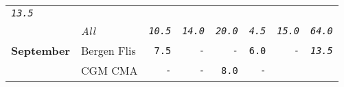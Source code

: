 \documentclass[11pt,A4paper,]{article}
\begin{document}
\begin{longtable}[]{@{}llrrrrrr@{}}
\begin{minipage}[t]{0.12\columnwidth}
\emph{\texttt{13.5}}\strut
\end{minipage}\tabularnewline
\begin{minipage}[t]{0.12\columnwidth}\raggedright\strut
\strut
\end{minipage} & \begin{minipage}[t]{0.12\columnwidth}\raggedright\strut
\emph{All}\strut
\end{minipage} & \begin{minipage}[t]{0.12\columnwidth}\raggedleft\strut
\emph{\texttt{10.5}}\strut
\end{minipage} & \begin{minipage}[t]{0.12\columnwidth}\raggedleft\strut
\emph{\texttt{14.0}}\strut
\end{minipage} & \begin{minipage}[t]{0.12\columnwidth}\raggedleft\strut
\emph{\texttt{20.0}}\strut
\end{minipage} & \begin{minipage}[t]{0.12\columnwidth}\raggedleft\strut
\emph{\texttt{4.5}}\strut
\end{minipage} & \begin{minipage}[t]{0.12\columnwidth}\raggedleft\strut
\emph{\texttt{15.0}}\strut
\end{minipage} & \begin{minipage}[t]{0.12\columnwidth}\raggedleft\strut
\emph{\texttt{64.0}}\strut
\end{minipage}\tabularnewline
\textbf{September} & Bergen Flis & \texttt{7.5} & \texttt{-} &
\texttt{-} & \texttt{6.0} & \texttt{-} &
\emph{\texttt{13.5}}\tabularnewline
\begin{minipage}[t]{0.12\columnwidth}\raggedright\strut
\strut
\end{minipage} & \begin{minipage}[t]{0.12\columnwidth}\raggedright\strut
CGM CMA\strut
\end{minipage} & \begin{minipage}[t]{0.12\columnwidth}\raggedleft\strut
\texttt{-}\strut
\end{minipage} & \begin{minipage}[t]{0.12\columnwidth}\raggedleft\strut
\texttt{-}\strut
\end{minipage} & \begin{minipage}[t]{0.12\columnwidth}\raggedleft\strut
\texttt{8.0}\strut
\end{minipage} & \begin{minipage}[t]{0.12\columnwidth}\raggedleft\strut
\texttt{-}\strut

\end{minipage}
\end{longtable}
\end{document}
